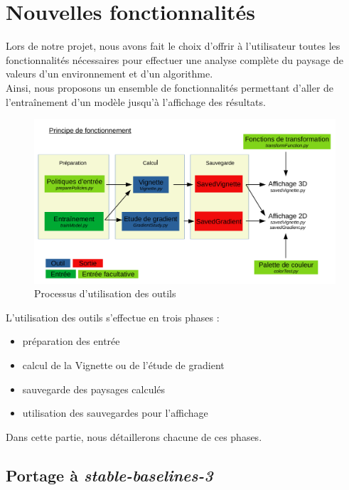 \documentclass[12pt]{article}
\begin{document}
\newpage
\section{Nouvelles fonctionnalités}

Lors de notre projet, nous avons fait le choix d'offrir à l'utilisateur toutes les fonctionnalités nécessaires pour effectuer une analyse complète du paysage de valeurs d'un environnement et d'un algorithme. \\

Ainsi, nous proposons un ensemble de fonctionnalités permettant d'aller de l'entraînement d'un modèle jusqu'à l'affichage des résultats. \\

\begin{figure}[htp]
    \centering
    \includegraphics[width=18cm]{Images/Principe}
    \caption{Processus d'utilisation des outils}
    \label{fig:principe}
\end{figure}

L'utilisation des outils s'effectue en trois phases : 
\begin{itemize}
	\item préparation des entrée
	\item calcul de la Vignette ou de l'étude de gradient
	\item sauvegarde des paysages calculés
	\item utilisation des sauvegardes pour l'affichage
\end{itemize}

Dans cette partie, nous détaillerons chacune de ces phases.

\newpage
\subsection{Portage à \emph{stable-baselines-3}}
\end{document}
